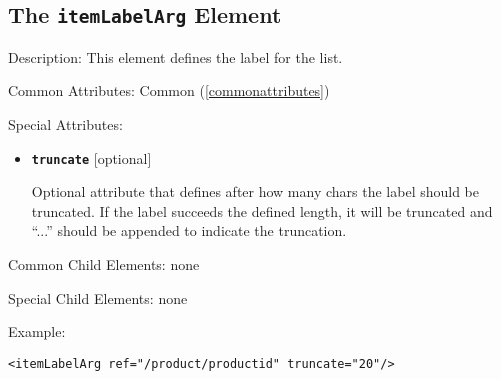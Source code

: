 \subsection{ The \texttt{itemLabelArg} Element}
\label{itemLabelArg}
\begin{description}
 \item Description: This element defines the label for the list.

 \item Common Attributes: Common (\ref{commonattributes})

 \item Special Attributes:

\begin{itemize}
 \item \textbf{\texttt{truncate}} [optional]

Optional attribute that defines after how many chars the label should be truncated. If the label succeeds the defined length, it will be truncated and ``...'' should be appended to indicate the truncation.
\end{itemize}

 \item Common Child Elements: none

 \item Special Child Elements: none

 \item Example: 

\begin{lstlisting}[caption=\texttt{itemLabelArg} Element]
<itemLabelArg ref="/product/productid" truncate="20"/>
\end{lstlisting}
\end{description}





